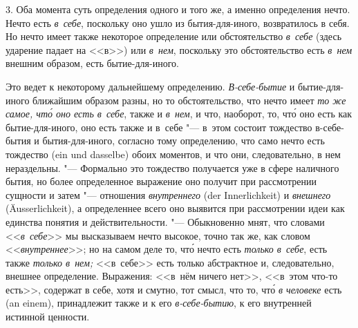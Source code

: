 3. Оба момента суть определения одного и того же, а именно определения
нечто. Нечто есть {\em в~себе}, поскольку оно ушло из
бытия-для-иного, возвратилось в себя. Но нечто имеет также некоторое
определение или обстоятельство {\em в~себе} (здесь
ударение падает на <<в>>) или {\em в~нем}, поскольку это
обстоятельство есть {\em в~нем} внешним образом, есть
бытие-для-иного.

Это ведет к некоторому дальнейшему определению.
{\em В-себе-бытие} и бытие-для-иного ближайшим
образом разны, но то обстоятельство, что нечто имеет
{\em то же самое, чт\'{о} оно есть в~себе}, также и {\em в~нем}, и что,
наоборот, то,
чт\'{о} оно есть как бытие-для-иного, оно есть также и в~себе "--- в~этом
состоит тождество в-себе-бытия и бытия-для-иного, согласно тому
определению, что само нечто есть тождество (ein und dasselbe) обоих
моментов, и что они, следовательно, в нем нераздельны. "--- Формально это
тождество получается уже в сфере наличного бытия, но более определенное
выражение оно получит при рассмотрении сущности и затем "--- отношения
{\em внутреннего} (der Inner\-lich\-keit) и
{\em внешнего} (Äusser\-lich\-keit), а определеннее всего
оно выявится при рассмотрении идеи как единства понятия и действительности.
"--- Обыкновенно мнят, что словами <<{\em в~себе}>> мы
высказываем нечто высокое, точно так же, как словом
<<{\em внутреннее}>>; но на самом деле то, чт\'{о} нечто есть
{\em только в~себе}, есть также {\em только в~нем;} <<в~себе>> есть только
абстрактное и, следовательно, внешнее определение. Выражения: <<в~нём
ничего нет>>, <<в~этом что-то есть>>, содержат в себе, хотя и смутно, тот
смысл, что то, чт\'{о} {\em в человеке} есть (an einem), принадлежит также
и к его {\em в-себе-бытию}, к его внутренней истинной ценности.

